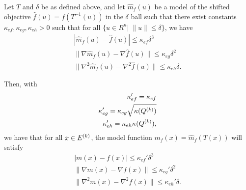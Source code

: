 
\begin{theorem}
\label{shifted_ellipsoid}
Let $T$ and $\delta$ be as defined above, and let $\hat m_f(u)$ be a model of the shifted objective $\hat f(u) = f(T^{-1}(u))$ in the $\delta$ ball such that
there exist constants $\kappa_{ef}, \kappa_{eg}, \kappa_{eh} > 0$ such that for all $\{u \in R^n | \;\|u\| \le \delta \}$, we have
\begin{align*}
|\hat m_f(u) - \hat f(u)| \le \kappa_{ef} \delta^3\\
\|\nabla \hat m_f(u) - \nabla \hat f(u)\| \le \kappa_{eg}\delta^2\\
\|\nabla^2 \hat m_f(u) - \nabla^2 \hat f(u)\| \le \kappa_{eh}\delta.
\end{align*}

Then, with
\begin{align*}
\kappa_{ef}' = \kappa_{ef} \\
\kappa_{eg}' = \kappa_{eg}\sqrt{\kappa({Q^{(k)}})} \\
\kappa_{eh}' = \kappa_{eh}\kappa({Q^{(k)}}),
\end{align*}
we have that for all $x \in {E^{(k)}}$,
the model function $m_f(x) = \hat m_f(T(x))$ will satisfy
\begin{align*}
| m(x) - f(x)| \le \kappa_{ef}'\delta^3 \\
\|\nabla  m(x) - \nabla  f(x)\| \le \kappa_{eg}'\delta^2 \\
\|\nabla^2 m(x) - \nabla^2 f(x)\| \le \kappa_{eh}'\delta.
\end{align*}
\end{theorem}

